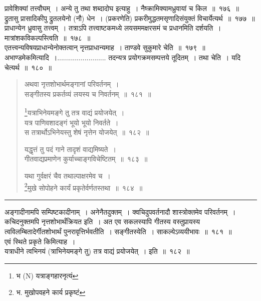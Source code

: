 \documentclass[11pt, openany]{book}
\begin{document}
प्रावेशिक्यां तत्त्वौघम्~। अन्ये तु तथा शब्दादोघ इत्याहु~। नैष्क्रामिक्यामध्रुवायां च किल~॥~१७६~॥\\

द्रुतासु प्रासादिकीपु द्रुतलयेनो (नौ) धेन~।  (प्रकरणेति) प्रकरीमुद्धतमसृणादिसंयुक्तं विचार्येत्यर्थ~॥~१७७~॥\\

प्राधान्येन ध्रुवासु तत्त्वम्~। तत्राऽपि तत्त्वाष्टकमध्ये लयसममक्षरसमं च प्रधानमिति दर्शयति~। मात्रांशकविकल्पस्त्विति~॥~१७८~॥\\ 

एतत्त्वन्यविषयप्राधान्येनोक्तत्वान् नृत्तप्राधान्यमाह~। ताण्डवे सुकुमारे चेति~॥~१७९~॥\\

अभाण्डमेकमित्यादि~।......................... तदन्यत्र प्रयोगक्रमसम्पत्तये तूदितम्~। तथा चेति~। यदि चेत्यर्थ~॥~१८०~॥

\newpage

\begin{quote}
{\na अथवा नृत्तशोभार्थमङ्गानां परिवर्तनम्~।\\
सङ्गीतस्य प्रकर्तव्यं लयस्य च निवर्तनम्~॥~१८१~॥ 

\renewcommand{\thefootnote}{1}\footnote{भ (N) यत्राङ्गहारनृत्यं}यत्राभिनेयमङ्गे तु तत्र वाद्यं प्रयोजयेत्~।\\
यत्र पाणिवशादङ्गं भूयो भूयो निवर्तते~।\\
स तत्रार्थोऽभिनेयस्तु शेषं नृत्तेन योजयेत्~॥~१८२~॥

यद्धृत्तं तु पदं गाने तादृशं वाद्यमिष्यते~।\\
गीतवाद्यप्रमाणेन कुर्याच्चाङ्गविचेष्टितम्~॥~१८३~॥

यथा गुर्वक्षरं चैव तथाल्पाक्षरमेव च~।\\
\renewcommand{\thefootnote}{2}\footnote{भ. मुखोपवहने कार्य प्रकृष्टं}मुखे सोपोहने कार्यं प्रकृतेर्वर्णतस्तथा~॥~१८४~॥}
\end{quote}

\hrule

\vspace{2mm}
\noindent
अङ्गादीनामपि सम्पिष्टकादीनाम्~। अनेनैतदुक्तम्~। क्वचिदुपवर्तनादौ शास्त्रोक्तमेव परिवर्तनम्~। कचिदनुक्तमपि नृत्तशोभार्थंक्रियत इति~। अत एव सकलस्यापि गीतस्य वस्तुप्रायस्य त्वविलम्बितादेर्गीतशोभार्थं पुनरावृत्तिर्भवतीति~। सङ्गीतस्येति~। साकल्येऽव्ययीभावः~॥~१८१~॥\\

एवं स्थिते प्रकृते किमित्याह~।\\

यत्राधीने त्वभिनयं (त्राभिनेयमङ्गे तु) तत्र वाद्यं प्रयोजयेत्~। इति~॥~१८२~॥
\end{document}
